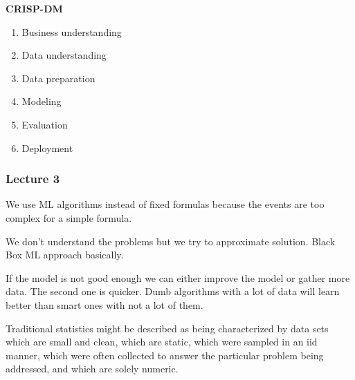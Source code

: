 \textbf{CRISP-DM}
\begin{enumerate}
    \item Business understanding
    \item Data understanding
    \item Data preparation
    \item Modeling
    \item Evaluation
    \item Deployment
\end{enumerate}



\vspace{10pt}



\subsubsection{Lecture 3}


We use ML algorithms instead of fixed formulas because the events are too complex for a simple formula.

We don't understand the problems but we try to approximate solution. Black Box ML approach basically.

\vspace{10pt}

If the model is not good enough we can either improve the model or gather more data. The second one is quicker. Dumb algorithms with a lot of data will learn better than smart ones with not a lot of them.

\vspace{10pt}

Traditional statistics might be described as being characterized
by data sets which are small and clean, which are static,
which were sampled in an iid manner, which were often
collected to answer the particular problem being addressed,
and which are solely numeric.

